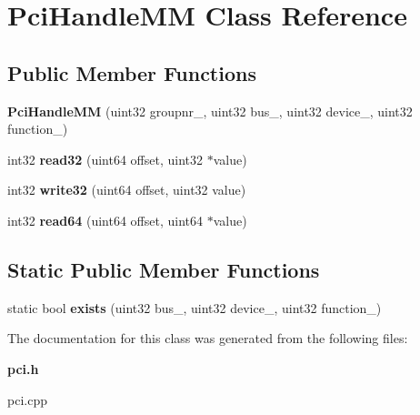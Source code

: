 \section{Pci\+Handle\+M\+M Class Reference}
\label{classPciHandleMM}
\subsection*{Public Member Functions}
\begin{DoxyCompactItemize}
\item 
{\bfseries Pci\+Handle\+M\+M} (uint32 groupnr\+\_\+, uint32 bus\+\_\+, uint32 device\+\_\+, uint32 function\+\_\+)\label{classPciHandleMM_ad228ca4f3665b17592fdf43229c8a776}

\item 
int32 {\bfseries read32} (uint64 offset, uint32 $\ast$value)\label{classPciHandleMM_a75b8adf35f6ef1bda3228cf78d07e4d7}

\item 
int32 {\bfseries write32} (uint64 offset, uint32 value)\label{classPciHandleMM_af57465df47969e4ca08b40cb964b5ef5}

\item 
int32 {\bfseries read64} (uint64 offset, uint64 $\ast$value)\label{classPciHandleMM_a1d9e24e51c83e17aeffd6eb4f1e8ff2c}

\end{DoxyCompactItemize}
\subsection*{Static Public Member Functions}
\begin{DoxyCompactItemize}
\item 
static bool {\bfseries exists} (uint32 bus\+\_\+, uint32 device\+\_\+, uint32 function\+\_\+)\label{classPciHandleMM_ade749e6d8c613e46189e3563d8520ab8}

\end{DoxyCompactItemize}


The documentation for this class was generated from the following files\+:\begin{DoxyCompactItemize}
\item 
{\bf pci.\+h}\item 
pci.\+cpp\end{DoxyCompactItemize}
